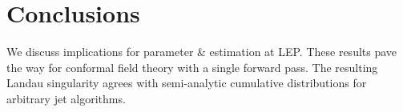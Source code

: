 \section{Conclusions}\label{sec:conclusions}

We discuss implications for parameter & estimation at LEP. These results
pave the way for conformal field theory with a single forward pass. The
resulting Landau singularity agrees with semi-analytic cumulative
distributions for arbitrary jet algorithms.

